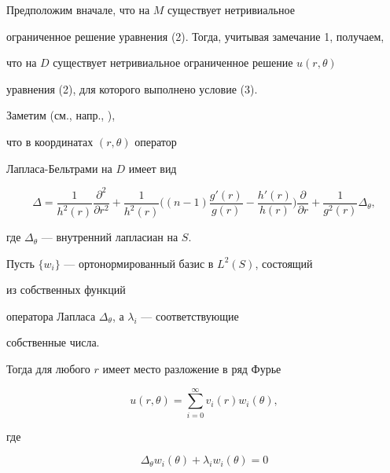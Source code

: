 \begin{pf} Предположим вначале, что на $M$ существует нетривиальное


ограниченное решение уравнения (2). Тогда, учитывая замечание 1, получаем,


что на $D$ существует нетривиальное ограниченное решение $u(r,\theta)$ 


уравнения (2), для которого выполнено условие (3).





Заметим (см., напр., \cite{Los}),


что в координатах $(r,\theta)$ оператор


Лапласа-Бельтрами на $D$ имеет вид


%


\begin{equation}


\Delta = \frac{1}{h^2(r)}\frac{\partial^2}{\partial r^2} + \frac{1}{h^2(r)}


\biggl((n-1)\frac{g'(r)}{g(r)} - \frac{h'(r)}{h(r)} \biggr) \frac{\partial}


{\partial r} + \frac{1}{g^2(r)}\Delta_\theta,


\end{equation}


%


где $\Delta_\theta$ --- внутренний лапласиан на $S$.





Пусть $\{w_i\}$ --- ортонормированный базис в $L^2(S)$, состоящий


из собственных функций


оператора Лапласа $\Delta_{\theta}$, а $\lambda_i$ --- соответствующие


собственные числа.


Тогда для любого $r$ имеет место разложение в ряд Фурье


%


\begin{equation}


u(r,\theta) = \sum_{i=0}^{\infty}v_i(r)w_i(\theta),


\end{equation}


%


где


$$


\Delta_\theta w_i(\theta) + \lambda_i w_i(\theta) = 0


$$



\end{pf}
